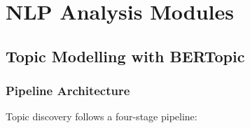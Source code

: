 \documentclass[11pt,a4paper]{article}
\begin{document}
\section{NLP Analysis Modules}
\label{sec:nlp}

\subsection{Topic Modelling with BERTopic}
\label{sec:topics}

\subsubsection{Pipeline Architecture}

Topic discovery follows a four-stage pipeline:
\end{document}
